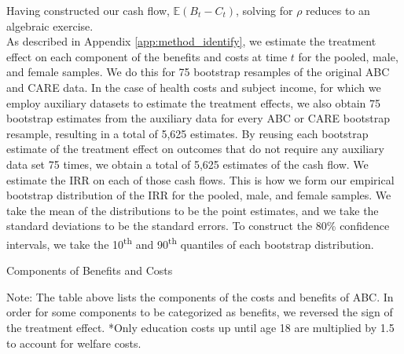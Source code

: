 \noindent Having constructed our cash flow, $\mathbb{E} (B_t - C_t)$, solving for $\rho$
reduces to an algebraic exercise. \\

\noindent As described in Appendix \ref{app:method_identify}, we estimate the treatment effect on each
component of the benefits and costs at time $t$ for the pooled, male, and
female samples. We do this for 75 bootstrap resamples of the original ABC and CARE data.
In the case of health costs and subject income, for which we employ auxiliary datasets to
estimate the treatment effects, we also obtain 75 bootstrap estimates from the auxiliary data
for every ABC or CARE bootstrap resample, resulting in a total of 5,625 estimates.
By reusing each bootstrap estimate of the treatment effect on outcomes that do not require any auxiliary data
set 75 times, we obtain a total of 5,625 estimates of the cash flow.
We estimate the IRR on each of those cash flows.
This is how we form our empirical bootstrap distribution of the IRR for the pooled, male, and female samples.
We take the mean of the distributions to be the point estimates, and we take the standard deviations
to be the standard errors. To construct the 80\% confidence intervals, we take the 10\textsuperscript{th}
and 90\textsuperscript{th} quantiles of each bootstrap distribution. \\

\begin{table}[H]
\begin{threeparttable}
\caption{Components of Benefits and Costs}
\label{table:bc_comp}
\centering

\begin{tablenotes}
\tiny
\item Note: The table above lists the components of the costs and benefits of ABC.
In order for some components to be categorized as benefits, we reversed the sign
of the treatment effect. *Only education costs up until age 18 are multiplied by 1.5 to account for welfare costs.
\end{tablenotes}
\end{threeparttable}
\end{table}





